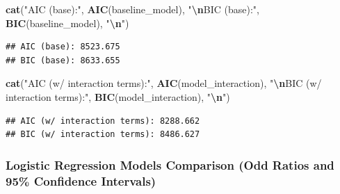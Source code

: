 \documentclass[
]{article}
\newenvironment{Shaded}{\begin{snugshade}}{\end{snugshade}}
\newcommand{\FunctionTok}[1]{\textcolor[rgb]{0.13,0.29,0.53}{\textbf{#1}}}
\newcommand{\NormalTok}[1]{#1}
\newcommand{\SpecialCharTok}[1]{\textcolor[rgb]{0.81,0.36,0.00}{\textbf{#1}}}
\newcommand{\StringTok}[1]{\textcolor[rgb]{0.31,0.60,0.02}{#1}}
\begin{document}
\begin{Shaded}
\begin{Highlighting}[]
\FunctionTok{cat}\NormalTok{(}\StringTok{"AIC (base):"}\NormalTok{, }\FunctionTok{AIC}\NormalTok{(baseline\_model), }\StringTok{"}\SpecialCharTok{\textbackslash{}n}\StringTok{BIC (base):"}\NormalTok{, }\FunctionTok{BIC}\NormalTok{(baseline\_model), }\StringTok{"}\SpecialCharTok{\textbackslash{}n}\StringTok{"}\NormalTok{)}
\end{Highlighting}
\end{Shaded}

\begin{verbatim}
## AIC (base): 8523.675 
## BIC (base): 8633.655
\end{verbatim}

\begin{Shaded}
\begin{Highlighting}[]
\FunctionTok{cat}\NormalTok{(}\StringTok{"AIC (w/ interaction terms):"}\NormalTok{, }\FunctionTok{AIC}\NormalTok{(model\_interaction), }\StringTok{"}\SpecialCharTok{\textbackslash{}n}\StringTok{BIC (w/ interaction terms):"}\NormalTok{, }\FunctionTok{BIC}\NormalTok{(model\_interaction), }\StringTok{"}\SpecialCharTok{\textbackslash{}n}\StringTok{"}\NormalTok{)}
\end{Highlighting}
\end{Shaded}

\begin{verbatim}
## AIC (w/ interaction terms): 8288.662 
## BIC (w/ interaction terms): 8486.627
\end{verbatim}

\hypertarget{logistic-regression-models-comparison-odd-ratios-and-95-confidence-intervals}{%
\subsubsection{Logistic Regression Models Comparison (Odd Ratios and
95\% Confidence
Intervals)}\label{logistic-regression-models-comparison-odd-ratios-and-95-confidence-intervals}}
\end{document}
